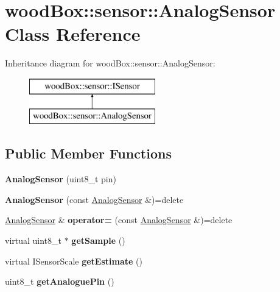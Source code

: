 \hypertarget{classwood_box_1_1sensor_1_1_analog_sensor}{}\section{wood\+Box\+:\+:sensor\+:\+:Analog\+Sensor Class Reference}
\label{classwood_box_1_1sensor_1_1_analog_sensor}
Inheritance diagram for wood\+Box\+:\+:sensor\+:\+:Analog\+Sensor\+:\begin{figure}[H]
\begin{center}
\leavevmode
\includegraphics[height=2.000000cm]{classwood_box_1_1sensor_1_1_analog_sensor}
\end{center}
\end{figure}
\subsection*{Public Member Functions}
\begin{DoxyCompactItemize}
\item 
\mbox{\label{classwood_box_1_1sensor_1_1_analog_sensor_a41d8ff91cf91d2bdbccffe8f1316421b}} 
{\bfseries Analog\+Sensor} (uint8\+\_\+t pin)
\item 
\mbox{\label{classwood_box_1_1sensor_1_1_analog_sensor_a8ee0238d3fab4515b5286e67f1f92083}} 
{\bfseries Analog\+Sensor} (const \mbox{\hyperlink{classwood_box_1_1sensor_1_1_analog_sensor}{Analog\+Sensor}} \&)=delete
\item 
\mbox{\label{classwood_box_1_1sensor_1_1_analog_sensor_a66111957aca931c1b1ea219749b03b3c}} 
\mbox{\hyperlink{classwood_box_1_1sensor_1_1_analog_sensor}{Analog\+Sensor}} \& {\bfseries operator=} (const \mbox{\hyperlink{classwood_box_1_1sensor_1_1_analog_sensor}{Analog\+Sensor}} \&)=delete
\item 
\mbox{\label{classwood_box_1_1sensor_1_1_analog_sensor_ae78c25d8c01ba9acd03f90f278966189}} 
virtual uint8\+\_\+t $\ast$ {\bfseries get\+Sample} ()
\item 
\mbox{\label{classwood_box_1_1sensor_1_1_analog_sensor_a74ddcfe84f3f5b9d7010442f365c4eee}} 
virtual I\+Sensor\+Scale {\bfseries get\+Estimate} ()
\item 
\mbox{\label{classwood_box_1_1sensor_1_1_analog_sensor_a5a7c67726db40be3edd48294910b117b}} 
uint8\+\_\+t {\bfseries get\+Analogue\+Pin} ()
\end{DoxyCompactItemize}
